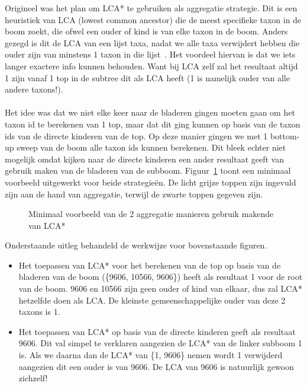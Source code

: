 Origineel was het plan om LCA* te gebruiken als aggregatie strategie.
Dit is een heuristiek van LCA (lowest common ancestor) die de meest specifieke taxon in de boom zoekt, die ofwel een ouder of kind is van elke taxon in de boom.
Anders gezegd is dit de LCA van een lijst taxa, nadat we alle taxa verwijdert hebben die ouder zijn van minstens 1 taxon in die lijst~\cite{UMGAP_paper}.
Het voordeel hiervan is dat we iets langer exactere info kunnen behouden.
Want bij LCA zelf zal het resultaat altijd 1 zijn vanaf 1 top in de subtree dit als LCA heeft (1 is namelijk ouder van alle andere taxons!).
\\ \\
Het idee was dat we niet elke keer naar de bladeren gingen moeten gaan om het taxon id te berekenen van 1 top, maar dat dit ging kunnen op basis van de taxon ids van de directe kinderen van de top.
Op deze manier gingen we met 1 bottom-up sweep van de boom alle taxon ids kunnen berekenen.
Dit bleek echter niet mogelijk omdat kijken naar de directe kinderen een ander resultaat geeft van gebruik maken van de bladeren van de subboom.
Figuur~\ref{fig:lca*_diff} toont een minimaal voorbeeld uitgewerkt voor beide strategieën.
De licht grijze toppen zijn ingevuld zijn aan de hand van aggregatie, terwijl de zwarte toppen gegeven zijn.

\begin{figure}[H]
    \centering
    \hspace{0.25\textwidth}%
    \caption{Minimaal voorbeeld van de 2 aggregatie manieren gebruik makende van LCA*}\label{fig:lca*_diff}
\end{figure}

Onderstaande uitleg behandeld de werkwijze voor bovenstaande figuren.
\begin{itemize}
    \item Het toepassen van LCA* voor het berekenen van de top op basis van de bladeren van de boom (\{9606, 10566, 9606\}) heeft als resultaat 1 voor de root van de boom.
    9606 en 10566 zijn geen ouder of kind van elkaar, dus zal LCA* hetzelfde doen als LCA\@.
    De kleinste gemeenschappelijke ouder van deze 2 taxons is 1.
    \item Het toepassen van LCA* op basis van de directe kinderen geeft als resultaat 9606.
    Dit val simpel te verklaren aangezien de LCA* van de linker subboom 1 is.
    Als we daarna dan de LCA* van \{1, 9606\} nemen wordt 1 verwijderd aangezien dit een ouder is van 9606.
    De LCA van 9606 is natuurlijk gewoon zichzelf!
\end{itemize}

